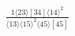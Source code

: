 \documentclass[varwidth, border=5pt]{standalone}
\begin{document}
\begin{my}
$\begin{gathered}
\scriptscriptstyle\frac{1⟨23⟩[34]⟨14⟩^2}{⟨13⟩⟨15⟩^2⟨45⟩[45]}
\end{gathered}$
\end{my}
\end{document}
